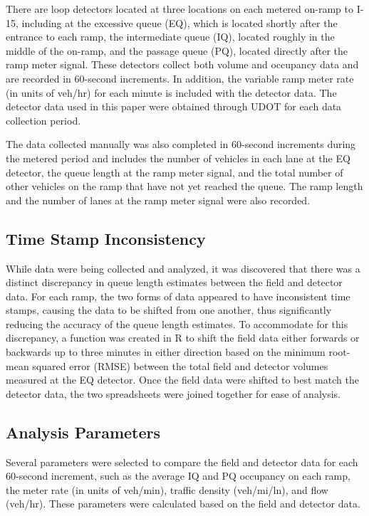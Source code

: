 \documentclass[numbered]{trbarticle}
\begin{document}
There are loop detectors located at three locations on each metered on-ramp to I-15, including at the excessive queue (EQ), which is located shortly after the entrance to each ramp, the intermediate queue (IQ), located roughly in the middle of the on-ramp, and the passage queue (PQ), located directly after the ramp meter signal. These detectors collect both volume and occupancy data and are recorded in 60-second increments. In addition, the variable ramp meter rate (in units of veh/hr) for each minute is included with the detector data. The detector data used in this paper were obtained through UDOT for each data collection period.

The data collected manually was also completed in 60-second increments during the metered period and includes the number of vehicles in each lane at the EQ detector, the queue length at the ramp meter signal, and the total number of other vehicles on the ramp that have not yet reached the queue. The ramp length and the number of lanes at the ramp meter signal were also recorded.

\hypertarget{time-stamp-inconsistency}{%
\subsection{Time Stamp Inconsistency}\label{time-stamp-inconsistency}}

While data were being collected and analyzed, it was discovered that there was a distinct discrepancy in queue length estimates between the field and detector data. For each ramp, the two forms of data appeared to have inconsistent time stamps, causing the data to be shifted from one another, thus significantly reducing the accuracy of the queue length estimates. To accommodate for this discrepancy, a function was created in R to shift the field data either forwards or backwards up to three minutes in either direction based on the minimum root-mean squared error (RMSE) between the total field and detector volumes measured at the EQ detector. Once the field data were shifted to best match the detector data, the two spreadsheets were joined together for ease of analysis.

\hypertarget{analysis-parameters}{%
\subsection{Analysis Parameters}\label{analysis-parameters}}

Several parameters were selected to compare the field and detector data for each 60-second increment, such as the average IQ and PQ occupancy on each ramp, the meter rate (in units of veh/min), traffic density (veh/mi/ln), and flow (veh/hr). These parameters were calculated based on the field and detector data.
\end{document}

